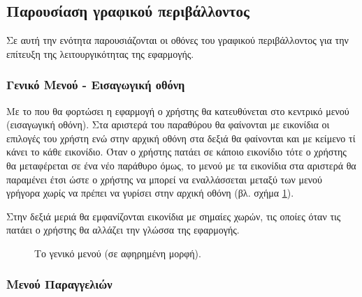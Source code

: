 \documentclass{assignment}
\begin{document}
\subsection{Παρουσίαση γραφικού περιβάλλοντος}

Σε αυτή την ενότητα παρουσιάζονται οι οθόνες του γραφικού περιβάλλοντος για την επίτευξη της λειτουργικότητας της εφαρμογής.

\subsubsection{Γενικό Μενού - Εισαγωγική οθόνη}

Με το που θα φορτώσει η εφαρμογή ο χρήστης θα κατευθύνεται στο κεντρικό μενού (εισαγωγική οθόνη). Στα αριστερά του παραθύρου θα φαίνονται με εικονίδια οι επιλογές του χρήστη ενώ στην αρχική οθόνη στα δεξιά θα φαίνονται και με κείμενο τί κάνει το κάθε εικονίδιο. Όταν ο χρήστης πατάει σε κάποιο εικονίδιο τότε ο χρήστης θα μεταφέρεται σε ένα νέο παράθυρο όμως, το μενού με τα εικονίδια στα αριστερά θα παραμένει έτσι ώστε ο χρήστης να μπορεί να εναλλάσσεται μεταξύ των μενού γρήγορα χωρίς να πρέπει να γυρίσει στην αρχική οθόνη (βλ. σχήμα \ref{fig:menu:general}). 

Στην δεξιά μεριά θα εμφανίζονται εικονίδια με σημαίες χωρών, τις οποίες όταν τις πατάει ο χρήστης θα αλλάζει την γλώσσα της εφαρμογής.

\begin{figure}
\begin{center}
\caption{Το γενικό μενού (σε αφηρημένη μορφή).}
\label{fig:menu:general}
\end{center}
\end{figure}

\subsubsection{Μενού Παραγγελιών}
\end{document}
